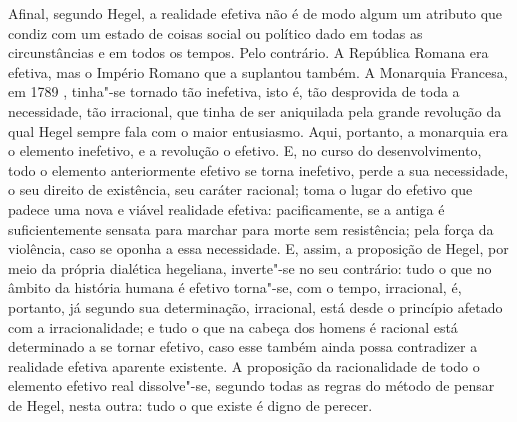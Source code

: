 Afinal,
segundo Hegel,
a realidade efetiva não é de modo algum um atributo que condiz com um
estado de coisas social ou político dado em todas as circunstâncias e em
todos os tempos. Pelo contrário. A República Romana era efetiva, mas o
Império Romano \textbar{} que a suplantou \textbar{} também. A Monarquia Francesa, \textbar{} em
1789 \textbar{}, tinha"-se tornado tão inefetiva, isto é, tão desprovida de toda a
necessidade, tão irracional, que tinha de ser aniquilada pela grande
revolução da qual %
Hegel sempre
fala com o maior entusiasmo. Aqui, portanto, a monarquia era o elemento
inefetivo, e a revolução o efetivo. E, no curso do desenvolvimento, todo o
elemento anteriormente efetivo se torna inefetivo, perde a sua
necessidade, o seu direito de existência, seu caráter racional; toma o
lugar do efetivo que padece uma nova e viável realidade efetiva:
pacificamente, se a antiga é suficientemente sensata para marchar para
morte sem resistência; pela força da violência, caso se oponha a essa
necessidade. E, assim, a proposição
de Hegel, por meio da própria dialética
hegeliana, inverte"-se no seu contrário: tudo o que no âmbito da história humana é
efetivo torna"-se, com o tempo, irracional, é, portanto, já segundo sua
determinação, irracional, está desde o princípio afetado com a
irracionalidade; e tudo o que na cabeça dos homens é racional está
determinado a se tornar efetivo, caso esse também ainda possa
contradizer a realidade efetiva aparente existente. A proposição da %
racionalidade de todo o elemento efetivo real dissolve"-se, segundo todas
as regras do método de pensar
de Hegel,
nesta outra: tudo o que existe é digno de perecer.

